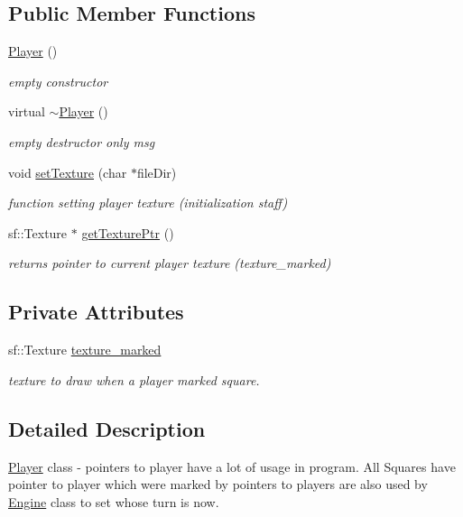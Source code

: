 \subsection*{Public Member Functions}
\begin{DoxyCompactItemize}
\item 
\hyperlink{class_player_affe0cc3cb714f6deb4e62f0c0d3f1fd8}{Player} ()
\begin{DoxyCompactList}\small\item\em empty constructor \end{DoxyCompactList}\item 
virtual \hyperlink{class_player_a749d2c00e1fe0f5c2746f7505a58c062}{$\sim$\+Player} ()
\begin{DoxyCompactList}\small\item\em empty destructor only msg \end{DoxyCompactList}\item 
void \hyperlink{class_player_ac2412646697fb7738a5d0c3aeb16ba94}{set\+Texture} (char $\ast$file\+Dir)
\begin{DoxyCompactList}\small\item\em function setting player texture (initialization staff) \end{DoxyCompactList}\item 
sf\+::\+Texture $\ast$ \hyperlink{class_player_a72e351147bd2bb48bdea9ba74dcc7f81}{get\+Texture\+Ptr} ()
\begin{DoxyCompactList}\small\item\em returns pointer to current player texture (texture\+\_\+marked) \end{DoxyCompactList}\end{DoxyCompactItemize}
\subsection*{Private Attributes}
\begin{DoxyCompactItemize}
\item 
sf\+::\+Texture \hyperlink{class_player_a9e50410dd4405082cc4374126e813a95}{texture\+\_\+marked}
\begin{DoxyCompactList}\small\item\em texture to draw when a player marked square. \end{DoxyCompactList}\end{DoxyCompactItemize}


\subsection{Detailed Description}
\hyperlink{class_player}{Player} class -\/ pointers to player have a lot of usage in program. All Squares have pointer to player which were marked by pointers to players are also used by \hyperlink{class_engine}{Engine} class to set whose turn is now. 

